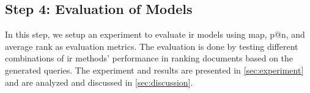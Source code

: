\subsection*{Step 4: Evaluation of Models}
In this step, we setup an experiment to evaluate \gls{ir} models using \gls{map}, p@n, and average rank as evaluation metrics.
The evaluation is done by testing different combinations of \gls{ir} methods' performance in ranking documents based on the generated queries. 
The experiment and results are presented in \autoref{sec:experiment} and are analyzed and discussed in \autoref{sec:discussion}.



